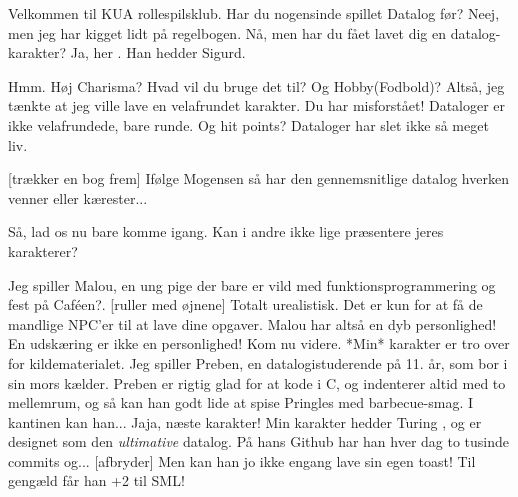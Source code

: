\documentclass[a4paper,11pt]{article}
\begin{document}
\begin{sketch}


 Velkommen til KUA rollespilsklub. Har du nogensinde spillet Datalog før?
 Neej, men jeg har kigget lidt på regelbogen.
 Nå, men har du fået lavet dig en datalog-karakter?
 Ja, her . Han hedder Sigurd.


 Hmm. Høj Charisma? Hvad vil du bruge det til?
 Og Hobby(Fodbold)?
 Altså, jeg tænkte at jeg ville lave en velafrundet karakter.
 Du har misforstået!  Dataloger er ikke velafrundede, bare runde.
 Og hit points? Dataloger har slet ikke så meget liv.

[trækker en bog frem] Ifølge Mogensen så har den
gennemsnitlige datalog hverken venner eller kærester...

 Så, lad os nu bare komme igang. Kan i andre ikke lige præsentere jeres
    karakterer?


 Jeg spiller Malou, en ung pige der bare er vild med funktionsprogrammering
    og fest på Caféen?.
[ruller med øjnene] Totalt urealistisk.
 Det er kun for at få de mandlige NPC'er til at lave dine opgaver.
 Malou har altså en dyb personlighed!
 En udskæring er ikke en personlighed!
 Kom nu videre.
 *Min* karakter er tro over for kildematerialet. Jeg spiller Preben, en
    datalogistuderende på 11. år, som bor i sin mors kælder. Preben er rigtig
    glad for at kode i C, og indenterer altid med to mellemrum, og så kan han
    godt lide at spise Pringles med barbecue-smag. I kantinen kan han...
 Jaja, næste karakter!
 Min karakter hedder Turing , og er designet som den
    \textit{ultimative} datalog.  På hans Github har han hver dag to tusinde commits og...
[afbryder] Men kan han jo ikke engang lave sin egen toast!
 Til gengæld får han +2 til SML!


\end{sketch}
\end{document}
